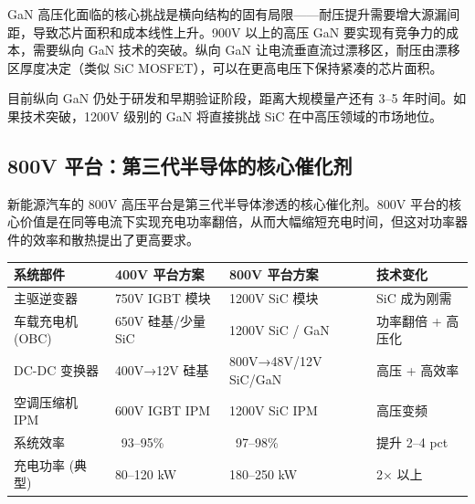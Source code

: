 \begin{exhibitbox}
\vspace{0.2cm}
\end{exhibitbox}

GaN 高压化面临的核心挑战是横向结构的固有局限——耐压提升需要增大源漏间距，导致芯片面积和成本线性上升。900V 以上的高压 GaN 要实现有竞争力的成本，需要纵向 GaN 技术的突破。纵向 GaN 让电流垂直流过漂移区，耐压由漂移区厚度决定（类似 SiC MOSFET），可以在更高电压下保持紧凑的芯片面积。

目前纵向 GaN 仍处于研发和早期验证阶段，距离大规模量产还有 3–5 年时间。如果技术突破，1200V 级别的 GaN 将直接挑战 SiC 在中高压领域的市场地位。

\subsection{800V 平台：第三代半导体的核心催化剂}

新能源汽车的 800V 高压平台是第三代半导体渗透的核心催化剂。800V 平台的核心价值是在同等电流下实现充电功率翻倍，从而大幅缩短充电时间，但这对功率器件的效率和散热提出了更高要求。

\begin{exhibitbox}[表 4-9：400V 与 800V 平台器件需求对比]
\centering
\small
\setlength{\tabcolsep}{4pt}
\begin{tabularx}{\textwidth}{X C{3.2cm} C{3.2cm} C{3.2cm}}
\toprule
\textbf{系统部件} & \textbf{400V 平台方案} & \textbf{800V 平台方案} & \textbf{技术变化} \\
\midrule
主驱逆变器 & 750V IGBT 模块 & 1200V SiC 模块 & SiC 成为刚需 \\
车载充电机 (OBC) & 650V 硅基/少量 SiC & 1200V SiC / GaN & 功率翻倍 + 高压化 \\
DC-DC 变换器 & 400V→12V 硅基 & 800V→48V/12V SiC/GaN & 高压 + 高效率 \\
空调压缩机 IPM & 600V IGBT IPM & 1200V SiC IPM & 高压变频 \\
\midrule
{}
系统效率 & ~93–95\% & ~97–98\% & 提升 2–4 pct \\
充电功率 (典型) & 80–120 kW & 180–250 kW & 2× 以上 \\
\bottomrule
\end{tabularx}
\end{exhibitbox}

